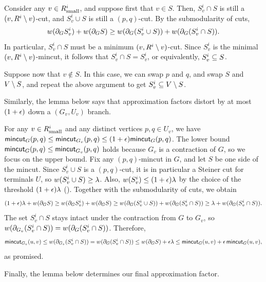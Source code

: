 Consider any $v\in R^i_{\textup{small}}$, and suppose first that $v\in S$. Then, $S^i_v\cap S$ is still a $(v,R^i\setminus v)$-cut, and $S^i_v\cup S$ is still a $(p,q)$-cut. By the submodularity of cuts,
\[ w(\partial_GS^i_v) + w(\partial_GS) \ge w(\partial_G(S^i_v\cup S)) + w(\partial_G(S^i_v\cap S)). \]
In particular, $S^i_v\cap S$ must be a minimum $(v,R^i\setminus v)$-cut. Since $S^i_v$ is the minimal $(v,R^i\setminus v)$-mincut, it follows that $S^i_v\cap S = S^i_v$, or equivalently, $S^i_v\subseteq S$.

Suppose now that $v\notin S$. In this case, we can swap $p$ and $q$, and swap $S$ and $V\setminus S$, and repeat the above argument to get $S^i_v\subseteq V\setminus S$.
\EP

Similarly, the lemma below says that approximation factors distort by at most $(1+\epsilon)$ down a $(G_v,U_v)$ branch.

\BL{}
For any $v\in  R^i_{\textup{small}}$ and any distinct vertices $p,q\in U_v$, we have $\textsf{\textup{mincut}}_G(p,q)\le\textsf{\textup{mincut}}_{G_v}(p,q)\le(1+\epsilon)\textsf{\textup{mincut}}_G(p,q)$.
\EL
\BP
The lower bound $\textsf{\textup{mincut}}_G(p,q)\le\textsf{\textup{mincut}}_{G_v}(p,q)$ holds because $G_v$ is a contraction of $G$, so we focus on the upper bound.
Fix any $(p,q)$-mincut in $G$, and let $S$ be one side of the mincut. Since $S^i_v\cup S$ is a $(p,q)$-cut, it is in particular a Steiner cut for terminals $U$, so $w(S^i_v\cup S)\ge\lambda$. Also, $w(S^i_v)\le(1+\epsilon)\lambda$ by the choice of the threshold $(1+\epsilon)\lambda$ (). Together with the submodularity of cuts, we obtain
\[ (1+\epsilon)\lambda+w(\partial_GS) \ge w(\partial_GS^i_v) + w(\partial_GS) \ge w(\partial_G(S^i_v\cup S)) + w(\partial_G(S^i_v\cap S)) \ge \lambda + w(\partial_G(S^i_v\cap S)) .\]
The set $S^i_v\cap S$ stays intact under the contraction from $G$ to $G_v$, so $w(\partial_{G_v}(S^i_v\cap S))=w(\partial_G(S^i_v\cap S))$. Therefore,
\[ \textsf{\textup{mincut}}_{G_v}(u,v)\le w(\partial_{G_v}(S^i_v\cap S))=w(\partial_G(S^i_v\cap S)) \le w(\partial_GS)+\epsilon\lambda \le \textsf{\textup{mincut}}_G(u,v) + \epsilon\,\textsf{\textup{mincut}}_G(u,v) ,\]
as promised.
\EP

Finally, the lemma below determines our final approximation factor.

